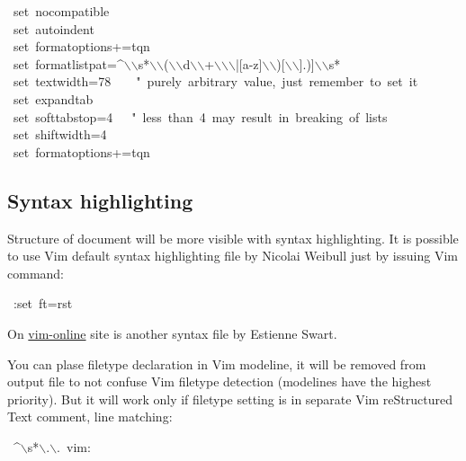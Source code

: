 \documentclass[12pt]{article}
\begin{document}
\begin{ttfamily}\begin{flushleft}
\mbox{~set~nocompatible}\\
\mbox{~set~autoindent}\\
\mbox{~set~formatoptions+=tqn}\\
\mbox{~set~formatlistpat=\^{}$\backslash$$\backslash$s*$\backslash$$\backslash$($\backslash$$\backslash$d$\backslash$$\backslash$+$\backslash$$\backslash$$\backslash$|[a-z]$\backslash$$\backslash$)[$\backslash$$\backslash$].)]$\backslash$$\backslash$s*}\\
\mbox{~set~textwidth=78~~~~"~purely~arbitrary~value,~just~remember~to~set~it}\\
\mbox{~set~expandtab}\\
\mbox{~set~softtabstop=4~~~"~less~than~4~may~result~in~breaking~of~lists}\\
\mbox{~set~shiftwidth=4}\\
\mbox{~set~formatoptions+=tqn}\\
\end{flushleft}\end{ttfamily}

\hypertarget{lsyntax-highlighting}{}
\subsection{Syntax highlighting}

Structure of document will be more visible with syntax highlighting. It is
possible to use Vim default syntax highlighting file by Nicolai Weibull just
by issuing Vim command:

\begin{ttfamily}\begin{flushleft}
\mbox{~:set~ft=rst}\\
\end{flushleft}\end{ttfamily}

On \href{http://www.vim.org/scripts/script.php?script_id=973}{vim-online} site is another syntax file by Estienne Swart.

You can plase filetype declaration in Vim modeline, it will be removed from
output file to not confuse Vim filetype detection (modelines have the highest
priority). But it will work only if filetype setting is in separate Vim reStructured Text
comment, line matching:

\begin{ttfamily}\begin{flushleft}
\mbox{~\^{}$\backslash$s*$\backslash$.$\backslash$.~vim:}\\
\end{flushleft}\end{ttfamily}
\end{document}
